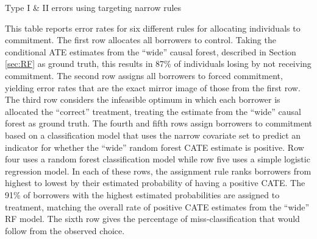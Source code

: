 \documentclass[oneside,11pt]{article}
\begin{document}
\begin{table}[H]
\caption{Type I \& II errors using targeting narrow rules}
\label{hit_miss_rule}
\begin{center}
\resizebox{0.95\textwidth}{!}{
\small{}
}
\end{center}
\scriptsize This table reports error rates for six different rules for allocating individuals to commitment. The first row allocates all borrowers to control. Taking the conditional ATE estimates from the ``wide'' causal forest, described in Section \ref{sec:RF} as ground truth, this results in 87\% of individuals losing by not receiving commitment. The second row assigns all borrowers to forced commitment, yielding error rates that are the exact mirror image of those from the first row.  The third row considers the infeasible optimum in which each borrower is allocated the ``correct'' treatment, treating the estimate from the ``wide'' causal forest as ground truth. The fourth and fifth rows assign borrowers to commitment based on a classification model that uses the narrow covariate set to predict an indicator for whether the ``wide'' random forest CATE estimate is positive. Row four uses a random forest classification model while row five uses a simple logistic regression model. In each of these rows, the assignment rule ranks borrowers from highest to lowest by their estimated probability of having a positive CATE. The 91\% of borrowers with the highest estimated probabilities are assigned to treatment, matching the overall rate of positive CATE estimates from the ``wide'' RF model. The sixth row gives the percentage of miss-classification that would follow from the observed choice. 

\end{table} 

\vspace{.3in}
\end{document}
